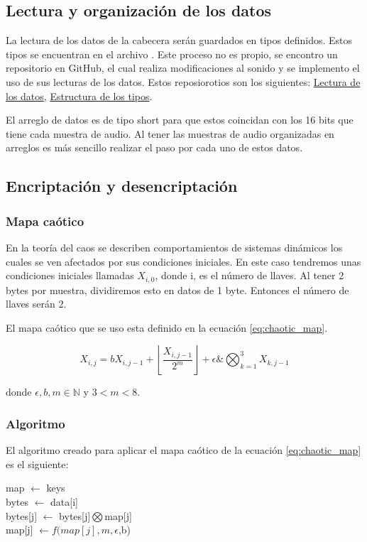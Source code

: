 \subsection{Lectura y organización de los datos}

La lectura de los datos de la cabecera serán guardados en tipos definidos. Estos tipos se encuentran en el archivo . Este proceso no es propio, se encontro un repositorio en GitHub, el cual realiza modificaciones al sonido y se implemento el uso de sus lecturas de los datos. Estos reposiorotios son los siguientes: \href{https://github.com/fabrizzio-gz/wav/}{Lectura de los datos}, \href{https://topic.alibabacloud.com/a/c-language-parsing-wav-audio-files_1_31_30000716.html}{Estructura de los tipos}.

El arreglo de datos es de tipo short para que estos coincidan con los 16 bits que tiene cada muestra de audio. Al tener las muestras de audio organizadas en arreglos es más sencillo realizar el paso por cada uno de estos datos.

\subsection{Encriptación y desencriptación}

\subsubsection{Mapa caótico}

En la teoría del caos se describen comportamientos de sistemas dinámicos los cuales se ven afectados por sus condiciones iniciales\cite{ott_2002}. En este caso tendremos unas condiciones iniciales llamadas $X_{i,0}$, donde i, es el número de llaves. Al tener 2 bytes por muestra, dividiremos esto en datos de 1 byte. Entonces el número de llaves serán 2.

El mapa caótico que se uso esta definido en la ecuación \ref{eq:chaotic_map}.

\begin{equation}
    X_{i,j} = b X_{i,j-1} + \left \lfloor \frac{X_{i,j-1}}{2^m} \right \rfloor + \epsilon \& \bigotimes_{k=1}^3 X_{k,j-1} \label{eq:chaotic_map}
\end{equation}

donde $\epsilon, b, m \in \mathbb{N}$ y $3<m<8$.

\subsubsection{Algoritmo}

El algoritmo creado para aplicar el mapa caótico de la ecuación \ref{eq:chaotic_map} es el siguiente:

\begin{algorithm}[H]
    map $\gets$ keys\\
    {
        bytes $\gets$ data[i]\\
        {
            bytes[j] $\gets$ bytes[j]$\bigotimes$map[j]\\
            map[j] $\gets f(map[j],m,\epsilon$,b)\\
        }
    }
\end{algorithm}